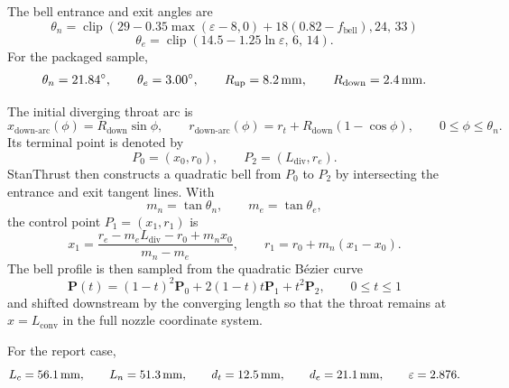 \documentclass[11pt]{article}
\newcommand{\clip}{\operatorname{clip}}
\begin{document}
The bell entrance and exit angles are
\begin{equation}
\theta_n=
\clip\!\left(
29
-0.35\max(\varepsilon-8,0)
+18(0.82-f_{\text{bell}}),
24,\,
33
\right)
\label{eq:bell-entrance-angle}
\end{equation}
\begin{equation}
\theta_e=
\clip\!\left(
14.5-1.25\ln\varepsilon,\,
6,\,
14
\right).
\label{eq:bell-exit-angle}
\end{equation}
For the packaged sample,
\[
\theta_n=\SI{21.84}{\degree},
\qquad
\theta_e=\SI{3.00}{\degree},
\qquad
R_{\text{up}}=\SI{8.2}{mm},
\qquad
R_{\text{down}}=\SI{2.4}{mm}.
\]

The initial diverging throat arc is
\begin{equation}
x_{\text{down-arc}}(\phi)=R_{\text{down}}\sin\phi,
\qquad
r_{\text{down-arc}}(\phi)=r_t+R_{\text{down}}\left(1-\cos\phi\right),
\qquad 0\le \phi\le \theta_n.
\label{eq:diverging-arc}
\end{equation}
Its terminal point is denoted by
\[
P_0=(x_0,r_0),
\qquad
P_2=(L_{\text{div}},r_e).
\]
StanThrust then constructs a quadratic bell from $P_0$ to $P_2$ by intersecting the entrance and exit tangent lines. With
\[
m_n=\tan\theta_n,
\qquad
m_e=\tan\theta_e,
\]
the control point $P_1=(x_1,r_1)$ is
\begin{equation}
x_1=\frac{r_e-m_eL_{\text{div}}-r_0+m_nx_0}{m_n-m_e},
\qquad
r_1=r_0+m_n(x_1-x_0).
\label{eq:bell-control-point}
\end{equation}
The bell profile is then sampled from the quadratic B\'ezier curve
\begin{equation}
\mathbf{P}(t)=(1-t)^2\mathbf{P}_0+2(1-t)t\mathbf{P}_1+t^2\mathbf{P}_2,
\qquad 0\le t\le 1
\label{eq:bell-bezier}
\end{equation}
and shifted downstream by the converging length so that the throat remains at $x=L_{\text{conv}}$ in the full nozzle coordinate system.

For the report case,
\[
L_c=\SI{56.1}{mm}, \qquad
L_n=\SI{51.3}{mm}, \qquad
d_t=\SI{12.5}{mm}, \qquad
d_e=\SI{21.1}{mm}, \qquad
\varepsilon=2.876.
\]
\end{document}
